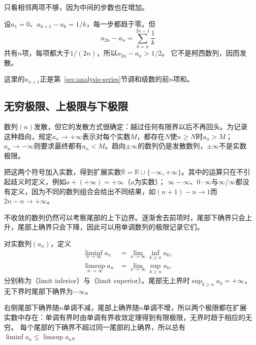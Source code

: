 只看相邻两项不够，因为中间的步数也在增加。
\begin{example}[相邻差趋于零的发散数列]
\label{ex:ru-harmonic-partial-sums-not-cauchy}
设$a_1=0$、$a_{k+1}-a_k=1/k$，每一步都趋于零。但
\[
 a_{2n}-a_n=\sum_{k=n}^{2n-1}\frac1k
\]
共有$n$项，每项都大于$1/(2n)$，所以$a_{2n}-a_n>1/2$。
它不是柯西数列，因而发散。
\end{example}
这里的$a_{n+1}$正是第~\ref{sec:analysis-series}节调和级数的前$n$项和。

\subsection{无穷极限、上极限与下极限}
\label{sec:ru-infinite-limits-limsup}

数列$(n)$发散，但它的发散方式很确定：越过任何有限界以后不再回头。为记录这种趋向，规定$a_n\to+\infty$表示对每个实数$M$，都存在$N$使$n\geq N$时$a_n>M$；
$a_n\to-\infty$则要求最终都有$a_n<M$。趋向$\pm\infty$的数列仍是发散数列，$\pm\infty$不是实数极限。

把这两个符号加入实数，得到扩展实数$\overline{\mathbb R}=\mathbb R\cup\{-\infty,+\infty\}$。其中的运算只在不引起歧义时定义，例如$a+(+\infty)=+\infty$（$a$为实数）；
$\infty-\infty$、$0\cdot\infty$与$\infty/\infty$都没有定义，因为不同的数列组合会给出不同结果，如$(n+1)-n\to1$而$2n-n\to+\infty$。

不收敛的数列仍然可以考察尾部的上下边界。逐渐舍去前项时，尾部下确界只会上升，尾部上确界只会下降，因此可以用单调数列的极限记录它们。
\begin{definition}[上极限与下极限]
\label{def:analysis-liminf-limsup}
对实数列$(a_n)$，定义
\begin{equation}
 \begin{aligned}
 \liminf_{n\to\infty}a_n&=\lim_{n\to\infty}\inf_{k\geq n}a_k,\\
 \limsup_{n\to\infty}a_n&=\lim_{n\to\infty}\sup_{k\geq n}a_k,
 \end{aligned}
 \label{eq:analysis-liminf-limsup}
\end{equation}
分别称为（limit inferior）与（limit superior）。尾部无上界时$\sup_{k\geq n}a_k=+\infty$，无下界时尾部下确界为$-\infty$。
\end{definition}
右侧尾部下确界随$n$单调不减，尾部上确界随$n$单调不增，所以两个极限都在扩展实数中存在：单调有界时由单调有界收敛定理得到有限极限，无界时趋于相应的无穷。
每个尾部的下确界不超过同一尾部的上确界，所以总有$\liminf a_n\leq\limsup a_n$。

